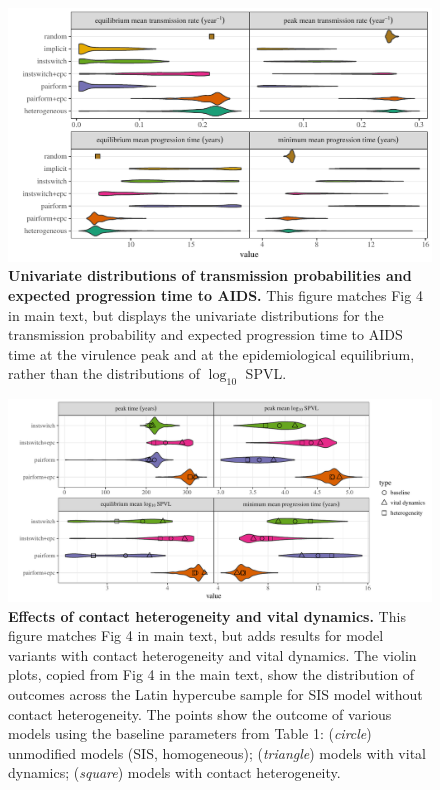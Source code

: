 \documentclass[10pt,letterpaper]{article}
\newcommand{\Lspvl}{$\log_{10}$ SPVL}
\begin{document}
\clearpage

\begin{figure}[!ht]
  \includegraphics[width=\textwidth]{../figures/fig_S2_3.pdf}
\caption{{\bf Univariate distributions of transmission probabilities and expected progression time to AIDS.}
This figure matches Fig 4 in main text, but displays the
univariate distributions for the transmission probability and expected progression time to AIDS time at the virulence
peak and at the epidemiological equilibrium,
rather than the distributions of \Lspvl.
}
\label{fig:trandursum}
\end{figure}

\clearpage

\begin{figure}[!ht]
  \includegraphics[width=\textwidth]{../figures/fig_S2_4.pdf}
\caption{{\bf Effects of contact heterogeneity and vital dynamics.}
This figure matches Fig 4 in main text, but adds results
for model variants with contact heterogeneity and vital dynamics.
The violin plots, copied from Fig 4 in the main text, show the
distribution of outcomes across the Latin hypercube sample
for SIS model without contact heterogeneity. The points show
the outcome of various models using the baseline parameters
from Table 1: (\emph{circle}) unmodified 
models (SIS, homogeneous); (\emph{triangle}) models with vital dynamics; 
(\emph{square}) models with contact heterogeneity.
}
\label{fig:fig3aug}
\end{figure}
\end{document}
